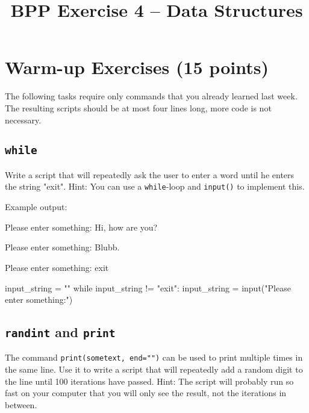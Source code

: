 


\title{BPP Exercise 4 -- Data Structures}




\section{Warm-up Exercises (15 points)}

The following tasks require only commands that you already learned last week. The resulting scripts should be at most four lines long, more code is not necessary.	

\subsection{\texttt{while}}

Write a script that will repeatedly ask the user to enter a word until he enters the string "exit". \newline
Hint: You can use a \texttt{while}-loop and \texttt{input()} to implement this.

\vspace{1em}

\noindent Example output:

\begin{outputcode}
Please enter something: 
Hi, how are you?

Please enter something:
Blubb.

Please enter something:
exit
\end{outputcode}

\begin{solution}
	\begin{pythoncode}
input_string = ""
while input_string != "exit":
	input_string = input("Please enter something:\n")
	\end{pythoncode}
\end{solution}


\subsection{\texttt{randint} and \texttt{print}}

The command \texttt{print(sometext, end="")} can be used to print multiple times in the same line. Use it to write a script that will repeatedly add a random digit to the line until 100 iterations have passed. \newline
Hint: The script will probably run so fast on your computer that you will only see the result, not the iterations in between.

